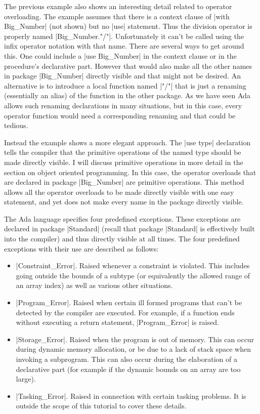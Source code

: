 The previous example also shows an interesting detail related to operator overloading. The
example assumes that there is a context clause of |with Big_Number| (not shown) but no |use|
statement. Thus the division operator is properly named |Big_Number."/"|. Unfortunately it can't
be called using the infix operator notation with that name. There are several ways to get around
this. One could include a |use Big_Number| in the context clause or in the procedure's
declarative part. However that would also make all the other names in package |Big_Number|
directly visible and that might not be desired. An alternative is to introduce a local function
named |"/"| that is just a renaming (essentially an alias) of the function in the other package.
As we have seen Ada allows such renaming declarations in many situations, but in this case,
every operator function would need a corresponding renaming and that could be tedious.

Instead the example shows a more elegant approach. The |use type| declaration tells the compiler
that the primitive operations of the named type should be made directly visible. I will discuss
primitive operations in more detail in the section on object oriented programming. In this case,
the operator overloads that are declared in package |Big_Number| are primitive operations. This
method allows all the operator overloads to be made directly visible with one easy statement,
and yet does not make every name in the package directly visible.

The Ada language specifies four predefined exceptions. These exceptions are declared in package
|Standard| (recall that package |Standard| is effectively built into the compiler) and thus
directly visible at all times. The four predefined exceptions with their use are described as
follows:

\begin{itemize}

\item |Constraint_Error|. Raised whenever a constraint is violated. This includes going outside
  the bounds of a subtype (or equivalently the allowed range of an array index) as well as
  various other situations.

\item |Program_Error|. Raised when certain ill formed programs that can't be detected by the
  compiler are executed. For example, if a function ends without executing a return statement,
  |Program_Error| is raised.

\item |Storage_Error|. Raised when the program is out of memory. This can occur during dynamic
  memory allocation, or be due to a lack of stack space when invoking a subprogram. This can
  also occur during the elaboration of a declarative part (for example if the dynamic bounds
  on an array are too large).

\item |Tasking_Error|. Raised in connection with certain tasking problems. It is outside the
  scope of this tutorial to cover these details.

\end{itemize}

